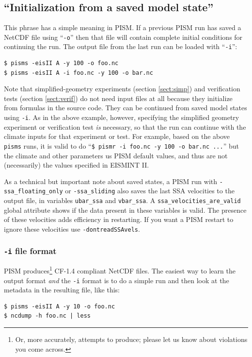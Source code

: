 \documentclass[titlepage,letterpaper,final]{scrartcl}
\begin{document}
\subsection{``Initialization from a saved model state''}  This phrase has a simple meaning in PISM.  If a previous PISM run has saved a NetCDF file using ``\texttt{-o}'' then that file will contain complete initial conditions for continuing the run.  The output file from the last run can be loaded with ``\texttt{-i}'': 

\begin{verbatim}
$ pisms -eisII A -y 100 -o foo.nc
$ pisms -eisII A -i foo.nc -y 100 -o bar.nc
\end{verbatim}
\smallskip

Note that simplified-geometry experiments (section \ref{sect:simp}) and verification tests (section \ref{sect:verif}) do not need input files at all because they initialize from formulas in the source code.  They can be continued from saved model states using \texttt{-i}.  As in the above example, however, specifying the simplified geometry experiment or verification test \emph{is} necessary, so that the run can continue with the climate inputs for that experiment or test.  For example, based on the above \texttt{pisms} runs, it is valid to do ``\texttt{\$ pismr -i foo.nc -y 100 -o bar.nc ...}'' but the climate and other parameters us PISM default values, and thus are not (necessarily) the values specified in EISMINT II.

As a technical but important note about saved states, a PISM run with \texttt{-ssa_floating_only} or \texttt{-ssa_sliding}
also saves the last SSA velocities to the output file, in variables 
\texttt{ubar_ssa} and \texttt{vbar_ssa}.  A \texttt{ssa_velocities_are_valid} global
attribute shows if the data present in these variables is valid.  The presence
of these velocities adds efficiency in restarting.  If you want a PISM restart to
ignore these velocities use \texttt{-dontreadSSAvels}.

\subsubsection*{\texttt{-i} file format}
PISM produces\footnote{Or, more accurately, attempts to produce; please let us know about violations you come across.} CF-1.4 compliant NetCDF files.  The easiest way to learn the output format \emph{and} the \texttt{-i} format is to do a simple run and then look at the metadata in the resulting file, like this:
\begin{verbatim}
$ pisms -eisII A -y 10 -o foo.nc
$ ncdump -h foo.nc | less
\end{verbatim}
\end{document}
